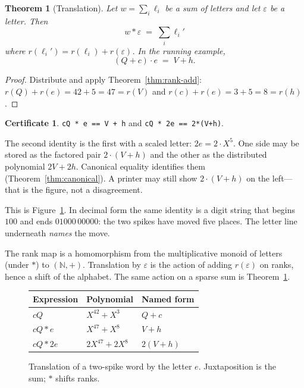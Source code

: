 \documentclass{article}
\newcommand{\NN}{\mathbb{N}}
\newcommand{\rank}{r}
\theoremstyle{plain}
\newtheorem{theorem}{Theorem}
\theoremstyle{definition}
\newtheorem*{certificate}{Certificate}
\theoremstyle{remark}
\begin{document}
\begin{theorem}[Translation]
\label{thm:translation}
Let \(w = \sum_i \ell_i\) be a sum of letters and let \(\varepsilon\) be a
letter. Then
\[
w * \varepsilon \;=\; \sum_i \ell_i'
\]
where \(\rank(\ell_i') = \rank(\ell_i) + \rank(\varepsilon)\). In the
running example,
\[
(Q+c)\cdot e \;=\; V+h.
\]
\end{theorem}

\begin{proof}
Distribute and apply Theorem~\ref{thm:rank-add}:
\(\rank(Q)+\rank(e)=42+5=47=\rank(V)\) and
\(\rank(c)+\rank(e)=3+5=8=\rank(h)\).
\end{proof}

\begin{certificate}
\texttt{cQ * e == V + h} and
\texttt{cQ * 2e == 2*(V+h)}.
\end{certificate}

The second identity is the first with a scaled letter: \(2e = 2\cdot X^5\).
One side may be stored as the factored pair \(2\cdot(V+h)\) and the other
as the distributed polynomial \(2V+2h\). Canonical equality identifies
them (Theorem~\ref{thm:canonical}). A printer may still show
\(2\cdot(V+h)\) on the left---that is the figure, not a disagreement.

This is Figure~\ref{fig:translation}. In decimal form the same identity is
a digit string that begins \(100\) and ends \(01000\,00000\): the two
spikes have moved five places. The letter line underneath \emph{names}
the move.

The rank map is a homomorphism from the multiplicative monoid of letters
(under \(*\)) to \((\NN,+)\). Translation by \(\varepsilon\) is the action
of adding \(\rank(\varepsilon)\) on ranks, hence a shift of the alphabet.
The same action on a sparse sum is Theorem~\ref{thm:translation}.

\begin{figure}[htbp]
\centering
\begin{tabular}{lll}
Expression & Polynomial & Named form \\
\hline
\(cQ\) & \(X^{42}+X^3\) & \(Q+c\) \\
\(cQ * e\) & \(X^{47}+X^8\) & \(V+h\) \\
\(cQ * 2e\) & \(2X^{47}+2X^8\) & \(2(V+h)\) \\
\end{tabular}
\caption{Translation of a two-spike word by the letter \(e\).
Juxtaposition is the sum; \(*\) shifts ranks.}
\label{fig:translation}
\end{figure}
\end{document}
